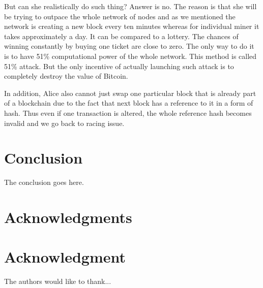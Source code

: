 \documentclass[conference,compsoc]{IEEEtran}
\begin{document}
But can she realistically do such thing? 
Answer is no.
The reason is that she will be trying to outpace the whole network of nodes and as we mentioned the network is creating a new block every ten minutes whereas for individual miner it takes approximately a day. 
It can be compared to a lottery. 
The chances of winning constantly by buying one ticket are close to zero. 
The only way to do it is to have 51\% computational power of the whole network.
This method is called 51\% attack. 
But the only incentive of actually launching such attack is to completely destroy the value of Bitcoin. 

In addition, Alice also cannot just swap one particular block that is already part of a blockchain due to the fact that next block has a reference to it in a form of hash. 
Thus even if one transaction is altered, the whole reference hash becomes invalid and we go back to racing issue.




\section{Conclusion}
The conclusion goes here.







\ifCLASSOPTIONcompsoc
  \section*{Acknowledgments}
\else
  \section*{Acknowledgment}
\fi


The authors would like to thank...






\end{document}
